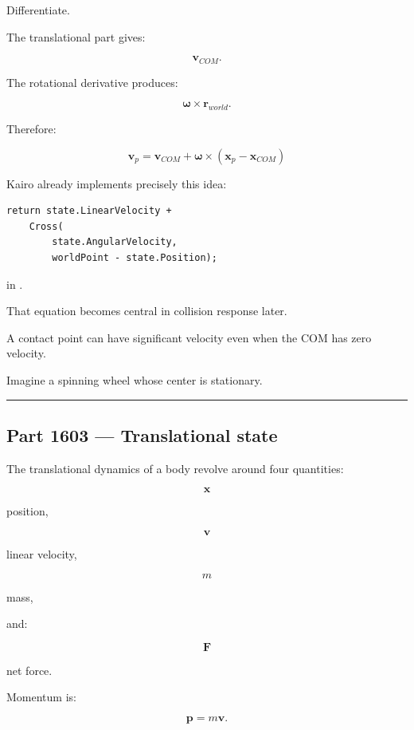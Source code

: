 Differentiate.

The translational part gives:

\[
\mathbf{v}_{COM}.
\]

The rotational derivative produces:

\[
\boldsymbol{\omega}\times\mathbf{r}_{world}.
\]

Therefore:

\[
\boxed{
\mathbf{v}_p
=
\mathbf{v}_{COM}
+
\boldsymbol{\omega}
\times
(\mathbf{x}_p-\mathbf{x}_{COM})
}
\]

Kairo already implements precisely this idea:

\begin{verbatim}
return state.LinearVelocity +
    Cross(
        state.AngularVelocity,
        worldPoint - state.Position);
\end{verbatim}

in .

That equation becomes central in collision response later.

A contact point can have significant velocity even when the COM has zero velocity.

Imagine a spinning wheel whose center is stationary.

\begin{center}\rule{0.5\linewidth}{0.5pt}\end{center}

\subsection{Part 1603 --- Translational state}\label{06-engine-ii-ch034-part-1603-translational-state}

\hypertarget{06-engine-ii-ch034-part-1603-translational-state}{}

The translational dynamics of a body revolve around four quantities:

\[
\mathbf{x}
\]

position,

\[
\mathbf{v}
\]

linear velocity,

\[
m
\]

mass,

and:

\[
\mathbf{F}
\]

net force.

Momentum is:

\[
\mathbf{p}=m\mathbf{v}.
\]

